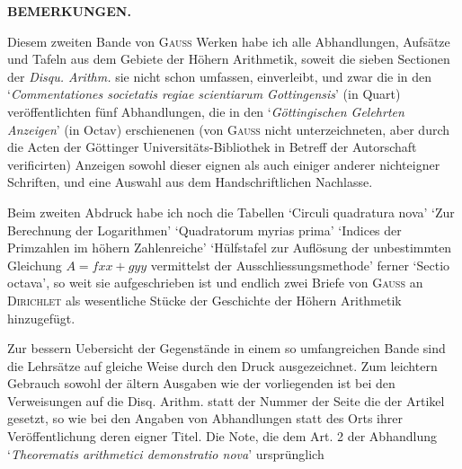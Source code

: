 \clearpage{}\renewcommand{\BookRunningTitle}{Bemerkungen.}
\begin{center}\textbf{BEMERKUNGEN.}\end{center}
Diesem zweiten Bande von \textsc{Gauss} Werken habe ich alle Abhandlungen, Aufsätze und Tafeln aus dem Gebiete der Höhern Arithmetik, soweit die sieben Sectionen der \textit{Disqu. Arithm.} sie nicht schon umfassen, einverleibt, und zwar die in den ‘\textit{Commentationes societatis regiae scientiarum Gottingensis}’ (in Quart) veröffentlichten fünf Abhandlungen, die in den ‘\textit{Göttingischen Gelehrten Anzeigen}’ (in Octav) erschienenen (von \textsc{Gauss} nicht unterzeichneten, aber durch die Acten der Göttinger Universitäts-Bibliothek in Betreff der Autorschaft verificirten) Anzeigen sowohl dieser eignen als auch einiger anderer nichteigner Schriften, und eine Auswahl aus dem Handschriftlichen Nachlasse.
\par Beim zweiten Abdruck habe ich noch die Tabellen ‘Circuli quadratura nova’ ‘Zur Berechnung der Logarithmen’ ‘Quadratorum myrias prima’ ‘Indices der Primzahlen im höhern Zahlenreiche’ ‘Hülfstafel zur Auflösung der unbestimmten Gleichung $A=fxx+gyy$ vermittelst der Ausschliessungsmethode’ ferner ‘Sectio octava’, so weit sie aufgeschrieben ist und endlich zwei Briefe von \textsc{Gauss} an \textsc{Dirichlet} als wesentliche Stücke der Geschichte der Höhern Arithmetik hinzugefügt.
\par Zur bessern Uebersicht der Gegenstände in einem so umfangreichen Bande sind die Lehrsätze auf gleiche Weise durch den Druck ausgezeichnet. Zum leichtern Gebrauch sowohl der ältern Ausgaben wie der vorliegenden ist bei den Verweisungen auf die Disq. Arithm. statt der Nummer der Seite die der Artikel gesetzt, so wie bei den Angaben von Abhandlungen statt des Orts ihrer Veröffentlichung deren eigner Titel. Die Note, die dem Art. 2 der Abhandlung ‘\textit{Theorematis arithmetici demonstratio nova}’ ursprünglich
